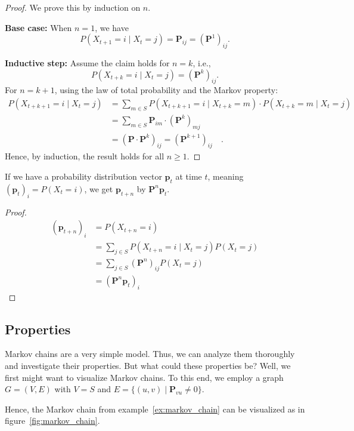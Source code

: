 \documentclass[../../main.tex]{subfiles}
\begin{document}
\begin{proof}
We prove this by induction on \( n \).

\textbf{Base case:} When \( n = 1 \), we have
\[
    P(X_{t+1} = i \mid X_t = j) = \bm{P}_{ij} = (\bm{P}^1)_{ij}.
\]

\textbf{Inductive step:} Assume the claim holds for \( n = k \), i.e.,
\[
    P(X_{t+k} = i \mid X_t = j) = (\bm{P}^k)_{ij}.
\]
For \( n = k+1 \), using the law of total probability and the Markov property:
\begin{align*}
    P(X_{t+k+1} = i \mid X_t = j) &= \sum_{m \in S} P(X_{t+k+1} = i \mid X_{t+k} = m) \cdot P(X_{t+k} = m \mid X_t = j) \\
    &= \sum_{m \in S} \bm{P}_{im} \cdot (\bm{P}^k)_{mj} \\
    &= (\bm{P} \cdot \bm{P}^k)_{ij} = (\bm{P}^{k+1})_{ij} \quad .
\end{align*}
Hence, by induction, the result holds for all \( n \geq 1 \).
\end{proof}

\begin{lemma}
    If we have a probability distribution vector $\bm{p}_t$ at time $t$, meaning $(\bm{p}_t)_i = P(X_t = i)$, we get $\bm{p}_{t+n}$ by $\bm{P}^n \bm{p}_t$.
\end{lemma}
\vspace{-2.5em}
\begin{proof}
    \begin{align*}
        (\bm{p}_{t+n})_i &= P(X_{t+n} = i) \\
        &= \sum_{j \in S} P(X_{t+n} = i \mid X_t = j) P(X_t = j) \\
        &= \sum_{j \in S} (\bm{P}^n)_{ij} P(X_t = j) \\
        &= (\bm{P}^n \bm{p}_t)_i
    \end{align*}
\end{proof}


\subsection{Properties}
Markov chains are a very simple model. Thus, we can analyze them thoroughly and investigate their properties. But what could these properties be? Well, we first might want to visualize Markov chains. To this end, we employ a graph $G = (V, E)$ with $V = S$ and $E = \{(u, v) \mid \bm{P}_{vu} \neq 0\}$.

Hence, the Markov chain from example~\ref{ex:markov_chain} can be visualized as in figure~\ref{fig:markov_chain}.
\end{document}
